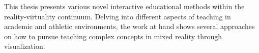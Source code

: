 This thesis presents various novel interactive educational methods within the reality-virtuality continuum.
Delving into different aspects of teaching in academic and athletic environments, the work at hand shows several approaches on how to pursue teaching complex concepts in mixed reality through visualization.
\begin{comment}
\newpage
\section*{\textcolor{black}{Zusammenfassung}}

Das Spektrum zwischen Realität und Virtualität – wie es durch das Reality-Virtuality-Kontinuum nach Milgram dargestellt wird – eröffnet ein nahezu unbegrenztes Potenzial für innovative Formen der Nutzerinteraktion.
Die vorliegende Arbeit untersucht neuartige Visualisierungsmethoden innerhalb dieses Kontinuums und deren Anwendungsmöglichkeiten zur Vermittlung komplexer Inhalte im Bildungsbereich sowie beim Lernen von Bewegungen.
Insbesondere spielt Interaktion eine zentrale Rolle für das virtuelle Lernen.
Erfahrungsbasierte Lernansätze (sog. \emph{Experiential Learning}) können Interaktion gezielt nutzen, um einzigartige Lernerfahrungen zu ermöglichen und dadurch den Lernprozess zu fördern.
Zur Heranführung an das Thema und seine theoretischen Grundlagen beginnt diese Arbeit mit einer Betrachtung der pädagogischen Grundlagen.
Dabei werden die Konzepte \emph{Experiential Learning}, \emph{Skill Learning} und \emph{Situated Learning} eingeführt und miteinander in Beziehung gesetzt, um eine Verbindung zum übergeordneten Ziel – der Wissensvermittlung durch virtuelle visuelle Unterstützung in Mixed Reality – herzustellen.

Aufbauend auf diesem Fundament wird ein neuartiges Framework für die akademische Lehre vorgestellt.
Dieses dient der Vermittlung komplexer theoretischer Inhalte aus dem Bereich der Computergrafik mittels eines ganzheitlichen Ansatzes, bestehend aus interaktiven Webanwendungen, Folien und Quizaufgaben.
Zu Evaluationszwecken wurde ein Split-Test mit 19 Studierenden durchgeführt.
Für acht Themen wurden jeweils zwei Gruppen gebildet: Eine Gruppe wiederholte das Thema auf konventionelle Weise mit Folien, die andere mithilfe der interaktiven Webanwendung.
Die Auswertung der Quiz-Ergebnisse vor und nach der Wiederholung zeigte, dass die mit der interaktiven Anwendung unterstützte Gruppe eine höhere Leistungssteigerung erzielte.
Darüber hinaus wurde das Framework einem UX-Experten und Lehrpersonal vorgestellt, wobei das Feedback durchweg positiv ausfiel.
Im Rahmen dieses Ansatzes wurde bewusst ein breiter Fokus gewählt, mit besonderem Augenmerk auf visuelle Interaktivität, Benutzerfreundlichkeit und offenen Zugang.


\end{comment}
